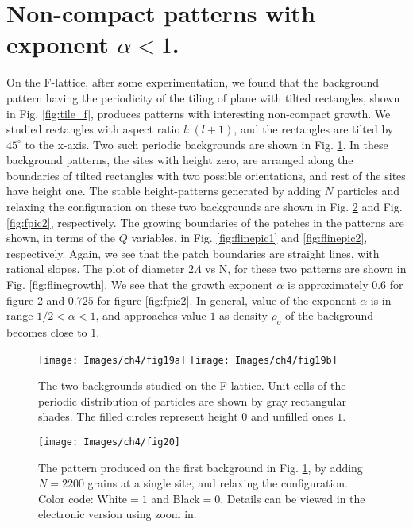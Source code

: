 \documentclass[11pt,a4paper]{book}
\begin{document}
\section{Non-compact patterns with exponent $\alpha<1$.\label{sec:ncfl}}
On the F-lattice, after some experimentation, we found that  the background pattern 
having the periodicity of the tiling of plane with tilted rectangles,
shown in Fig. \ref{fig:tile_f}, produces patterns with interesting non-compact
growth. We studied rectangles
with aspect ratio $l:(l+1)$, and the rectangles are tilted by
$45^{\circ}$ to the x-axis. Two such periodic backgrounds are shown in
Fig. \ref{fig:fbg}. In
these background patterns, the sites with height zero, are arranged
along the boundaries of tilted rectangles with two
possible orientations, and rest of the sites have
height one. The stable height-patterns generated by adding $N$
particles and relaxing the configuration on these two backgrounds are shown in Fig.
\ref{fig:fpic1} and Fig. \ref{fig:fpic2}, respectively. The growing boundaries of the
patches in the patterns are shown, in
terms of the $Q$ variables, in Fig. \ref{fig:flinepic1} and
\ref{fig:flinepic2}, respectively. Again, we see that the patch boundaries
are straight lines, with rational slopes.
The plot of diameter $2\Lambda$ vs N, for these two patterns are shown in Fig.
\ref{fig:flinegrowth}. We see
that the growth exponent $\alpha $ is approximately $0.6$ for figure
\ref{fig:fpic1} and $0.725$ for figure
\ref{fig:fpic2}. In general, value of the exponent $\alpha$ is in range
$1/2<\alpha <1$, and approaches value $1$ as density
$\rho_{o}$ of the background becomes close to $1$.
%
\begin{figure}
\begin{center}
\texttt{[image: Images/ch4/fig19a]}
\texttt{[image: Images/ch4/fig19b]}
\caption{The two backgrounds studied on the F-lattice. Unit cells of the periodic
distribution of particles are shown by gray rectangular shades. The filled
circles represent height $0$ and unfilled ones $1$.}
\label{fig:fbg}
\end{center}
\end{figure}
%
\begin{figure}
\begin{center}
\texttt{[image: Images/ch4/fig20]}
\caption{The pattern produced on the first background in
Fig. \ref{fig:fbg}, by adding $N=2200$ grains at a single site, and
relaxing the configuration. Color code: White$=1$ and Black$=0$.
Details can be viewed in the electronic
version using zoom in.}
\label{fig:fpic1}
\end{center}
\end{figure}
\end{document}
